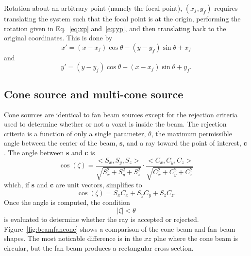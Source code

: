 Rotation about an arbitrary point (namely the focal point), $(x_f, y_f)$ requires translating the system such that the focal point is at the origin, performing the rotation given in Eq.~\ref{eq:xp} and~\ref{eq:yp}, and then translating back to the original coordinates. This is done by
\begin{equation}\label{eq:xp2}
x' = (x-x_f) \cos \theta - (y-y_f) \sin \theta + x_f
\end{equation}
and
\begin{equation}\label{eq:yp2}
y' = (y - y_f) \cos \theta + (x - x_f) \sin \theta + y_f.
\end{equation}

\subsection{Cone source and multi-cone source}
Cone sources are identical to fan beam sources except for the rejection criteria used to determine whether or not a voxel is inside the beam. The rejection criteria is a function of only a single parameter, $\theta$, the maximum permissible angle between the center of the beam, $\boldsymbol{s}$, and a ray toward the point of interest, $\boldsymbol{c}$. The angle between $\boldsymbol{s}$ and $\boldsymbol{c}$ is
\begin{equation}\label{eq:zetacos}
\cos(\zeta) = \frac{<S_x, S_y, S_z>}{\sqrt{S_x^2 + S_y^2 + S_z^2}} \cdot \frac{<C_x, C_y, C_z>}{\sqrt{C_x^2 + C_y^2 + C_z^2}}
\end{equation}
which, if $\boldsymbol{s}$ and $\boldsymbol{c}$ are unit vectors, simplifies to
\begin{equation}\label{eq:zetacos}
\cos(\zeta) = S_x C_x + S_y C_y + S_z C_z.
\end{equation}
Once the angle is computed, the condition
\begin{equation}\label{eq:zetacon}
|\zeta| < \theta
\end{equation}
is evaluated to determine whether the ray is accepted or rejected. Figure~\ref{fig:beamfancone} shows a comparison of the cone beam and fan beam shapes. The most noticable difference is in the $xz$ plne where the cone beam is circular, but the fan beam produces a rectangular cross section.

